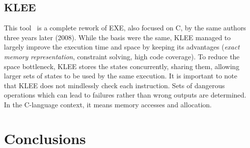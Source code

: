 \documentclass[11pt]{IEEEtran}
\begin{document}
    \subsection{KLEE}
      This tool~\cite{klee} is a complete rework of EXE, also focused on C, by the same authors three years later (2008). While the basis were the same, KLEE managed to largely improve the execution time and space by keeping its advantages (\emph{exact memory representation}, constraint solving, high code coverage). To reduce the space bottleneck, KLEE stores the states concurrently, sharing them, allowing larger sets of states to be used by the same execution. It is important to note that KLEE does not mindlessly check each instruction. Sets of dangerous operations which can lead to failures rather than wrong outputs are determined. In the C-language context, it means memory accesses and allocation. %

  \section{Conclusions}


\pagebreak
{}

\end{document}
